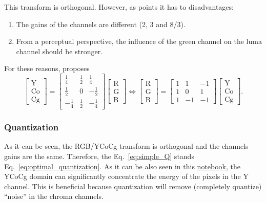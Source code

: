 This transform is orthogonal. However, as \cite{malvar2008lifting}
points it has to disadvantages:
\begin{enumerate}
\item The gains of the channels are different (2, 3 and 8/3).
\item From a perceptual perspective, the influence of the green
  channel on the luma channel should be stronger.
\end{enumerate}
For these reasons, \cite{malvar2008lifting} proposes
\begin{equation}
  \begin{bmatrix}
    \text{Y} \\
    \text{Co} \\
    \text{Cg}
  \end{bmatrix}
  =
  \begin{bmatrix}
    \frac{1}{4} &  \frac{1}{2}  &  \frac{1}{4} \\ 
    \frac{1}{2} &            0  & -\frac{1}{2} \\
    -\frac{1}{4} &  \frac{1}{2}  & -\frac{1}{4}
  \end{bmatrix}
  \begin{bmatrix}
    \text{R} \\
    \text{G} \\
    \text{B}
  \end{bmatrix}
  \Leftrightarrow
  \begin{bmatrix}
    \text{R} \\
    \text{G} \\
    \text{B}
  \end{bmatrix}
  =
  \begin{bmatrix}
    1  &  1  & -1 \\ 
    1  &  0  &  1 \\ 
    1  & -1  & -1
  \end{bmatrix}
  \begin{bmatrix}
    \text{Y} \\
    \text{Co} \\
    \text{Cg}
  \end{bmatrix}.
\end{equation}

\subsubsection{Quantization}
As it can be seen, the RGB/YCoCg transform is orthogonal and the
channels gains are the same. Therefore, the Eq.~\ref{eq:simple_Q}
stands Eq.~\ref{eq:optimal_quantization}.  As it can be also seen in
this \href{https://github.com/Sistemas-Multimedia/Sistemas-Multimedia.github.io/blob/master/study_guide/06-color_transform/performance.ipynb}{notebook},
the YCoCg domain can significantly concentrate the energy of the
pixels in the Y channel. This is beneficial because quantization will
remove (completely quantize) ``noise'' in the chroma channels.

